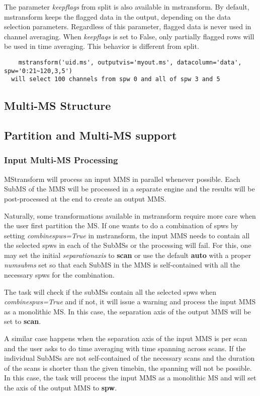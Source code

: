 The parameter {\it keepflags} from split is also available in mstransform. By
default, mstransform keeps the flagged data in the output, depending on the data
selection parameters. Regardless of this parameter, flagged data is never used
in channel averaging. When {\it keepflags} is set to False, only partially
flagged rows will be used in time averaging. This behavior is different from
split.

\begin{verbatim}
    mstransform('uid.ms', outputvis='myout.ms', datacolumn='data', spw='0:21~120,3,5')
  will select 100 channels from spw 0 and all of spw 3 and 5
\end{verbatim}

\subsection{Multi-MS Structure}

\subsection{Partition and Multi-MS support}

\subsubsection{Input Multi-MS Processing}
MStransform will process an input MMS in parallel whenever possible. Each SubMS
of the MMS will be processed in a separate engine and the results will be
post-processed at the end to create an output MMS.

Naturally, some transformations available in mstransform require more care
when the user first partition the MS. If one wants to do a combination of
spws by setting {\it combinespws=True} in mstransform, the input 
MMS needs to contain all the selected spws in each of the SubMSs or the
processing will fail. For this, one may set the initial {\it separationaxis}
to {\bf scan} or use the default {\bf auto} with a proper {\it numsubms} set so
that each SubMS in the MMS is self-contained with all the necessary spws
for the combination.

The task will check if the subMSs contain all the selected spws when
{\it combinespws=True} and if not, it will issue a warning and process the input
MMS as a monolithic MS. In this case, the separation axis of the output MMS will
be set to {\bf scan}.

A similar case happens when the separation axis of the input MMS is per scan
and the user asks to do time averaging with time spanning across scans. If the
individual SubMSs are not self-contained of the necessary scans and the
duration of the scans is shorter than the given timebin, the spanning will not
be possible. In this case, the task will process the input MMS as a monolithic
MS and will set the axis of the output MMS to {\bf spw}.

